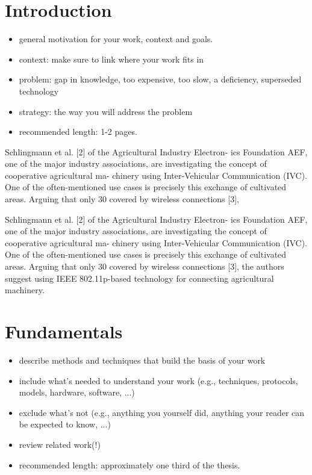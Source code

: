 \documentclass[]{nsm-thesis}
\begin{document}
\cleardoublepage
{}


\chapter{Introduction}
\label{sec:introduction}

\begin{itemize}
\item general motivation for your work, context and goals.
\item context: make sure to link where your work fits in
\item problem: gap in knowledge, too expensive, too slow, a deficiency, superseded technology
\item strategy: the way you will address the problem
\item recommended length: 1-2 pages.
\end{itemize}


Schlingmann et al. [2] of the Agricultural Industry Electron-
ics Foundation AEF, one of the major industry associations,
are investigating the concept of cooperative agricultural ma-
chinery using Inter-Vehicular Communication (IVC). One of
the often-mentioned use cases is precisely this exchange of
cultivated areas. Arguing that only 30 %
covered by wireless connections [3],


Schlingmann et al. [2] of the Agricultural Industry Electron-
ics Foundation AEF, one of the major industry associations,
are investigating the concept of cooperative agricultural ma-
chinery using Inter-Vehicular Communication (IVC). One of
the often-mentioned use cases is precisely this exchange of
cultivated areas. Arguing that only 30 %
covered by wireless connections [3], the authors suggest using
IEEE 802.11p-based technology for connecting agricultural
machinery. 

\chapter{Fundamentals}
\label{sec:fundamentals}



\begin{itemize}
\item describe methods and techniques that build the basis of your work
\item include what's needed to understand your work (e.g., techniques, protocols, models, hardware, software, ...)
\item exclude what's not (e.g., anything you yourself did, anything your reader can be expected to know, ...)
\item review related work(!)
\item recommended length: approximately one third of the thesis.
\end{itemize}
\end{document}
